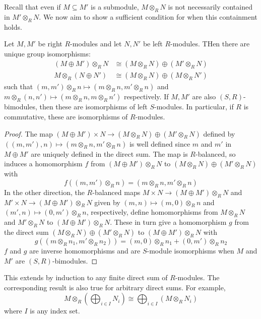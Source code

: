 \documentclass[12pt, a4paper, oneside, openright, titlepage]{book}
\begin{document}
Recall that even if $M \subseteq M'$ is a submodule, $M\otimes_R N$ is not necessarily contained in $M'\otimes_R N$. We now aim to show a sufficient condition for when this containment holds.

\begin{thm}
    Let $M,M'$ be right $R$-modules and let $N,N'$ be left $R$-modules. THen there are unique group isomorphisms: \begin{align*}
        (M\oplus M')\otimes_R N&\cong (M\otimes_R N)\oplus (M'\otimes_RN)\\
        M\otimes_R(N\oplus N') &\cong (M\otimes_R N)\oplus (M\otimes_RN')
    \end{align*}
    such that $(m,m')\otimes_Rn \mapsto (m\otimes_R n, m'\otimes_R n)$ and $m\otimes_R(n,n')\mapsto (m\otimes_R n,m\otimes_Rn')$ respectively. If $M,M'$ are also $(S,R)$-bimodules, then these are isomorphisms of left $S$-modules. In particular, if $R$ is commutative, these are isomorphisms of $R$-modules.
\end{thm}
\begin{proof}
    The map $(M\oplus M')\times N\rightarrow (M\otimes_R N)\oplus (M'\otimes_RN)$ defined by $((m,m'),n)\mapsto (m\otimes_Rn,m'\otimes_Rn)$ is well defined since $m$ and $m'$ in $M\oplus M'$ are uniquely defined in the direct sum. The map is $R$-balanced, so induces a homomorphism $f$ from $(M\oplus M')\otimes_R N$ to $(M\otimes_RN)\oplus(M'\otimes_RN)$ with \begin{equation*}
        f((m,m')\otimes_Rn) = (m\otimes_Rn,m'\otimes_Rn)
    \end{equation*}
    In the other direction, the $R$-balanced maps $M\times N \rightarrow (M\oplus M')\otimes_RN$ and $M'\times N \rightarrow (M\oplus M')\otimes_R N$ given by $(m,n)\mapsto (m,0)\otimes_Rn$ and $(m',n)\mapsto (0,m')\otimes_Rn$, respectively, define homomorphisms from $M\otimes_RN$ and $M'\otimes_RN$ to $(M\oplus M')\otimes_RN$. These in turn give a homomorphism $g$ from the direct sum $(M\otimes_RN)\oplus(M'\otimes_RN)$ to $(M\oplus M')\otimes_RN$ with \begin{equation*}
        g((m\otimes_Rn_1, m'\otimes_Rn_2)) = (m,0)\otimes_Rn_1+(0,m')\otimes_Rn_2
    \end{equation*}
    $f$ and $g$ are inverse homomorphisms and are $S$-module isomorphisms when $M$ and $M'$ are $(S,R)$-bimodules.
\end{proof}

This extends by induction to any finite direct sum of $R$-modules. The corresponding result is also true for arbitrary direct sums. For example, \begin{equation*}
    M\otimes_R\left(\bigoplus_{i \in I}N_i\right) \cong \bigoplus_{i\in I}(M\otimes_RN_i)
\end{equation*}
where $I$ is any index set.
\end{document}
